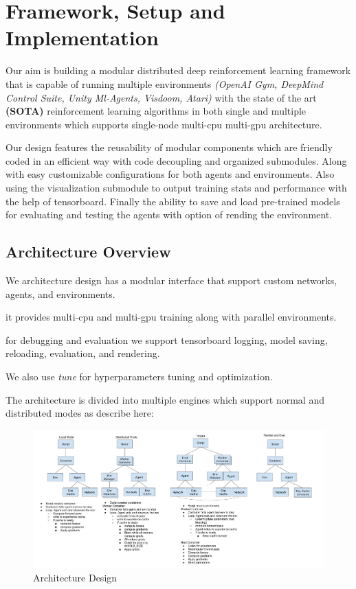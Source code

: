 
\chapter{Framework, Setup and Implementation}\label{chapter:Setup and Implementation}
Our aim is building a modular distributed deep reinforcement learning framework that is capable of running multiple environments \textit{(OpenAI Gym, DeepMind Control Suite, Unity Ml-Agents, Visdoom, Atari)} with the state of the art \textbf{(SOTA)} reinforcement learning algorithms in both single and multiple environments which supports single-node multi-cpu multi-gpu architecture.

Our design features the reusability of modular components which are friendly coded in an efficient way with code decoupling and organized submodules.
Along with easy customizable configurations for both agents and environments. Also using the visualization submodule to output training stats and performance with the help of tensorboard. Finally the ability to save and load pre-trained models for evaluating and testing the agents with option of rending the environment.

\section{Architecture Overview}
We architecture design has a modular interface that support custom networks, agents, and environments. 

it provides multi-cpu and multi-gpu training along with parallel environments. 

for debugging and evaluation we support tensorboard logging, model saving, reloading, evaluation, and rendering. 

We also use \textit{tune} for hyperparameters tuning and optimization.

The architecture is divided into multiple engines which support normal and distributed modes as describe here:

\begin{figure}[H]%
  \centering
  \includegraphics[width=\linewidth]{figures/architecture.png}%
  \caption{Architecture Design}%
  \label{fig:custom-reacher-xml}%
\end{figure}

